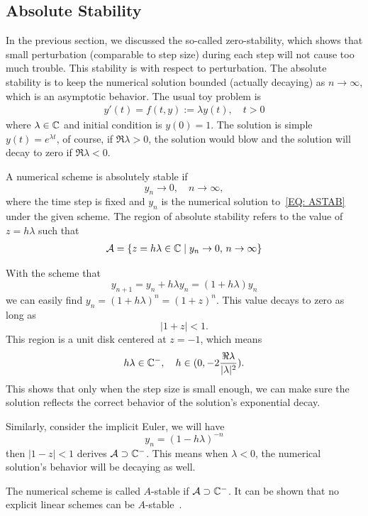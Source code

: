 \subsection{Absolute Stability}
In the previous section, we discussed the so-called zero-stability, which shows that small perturbation (comparable to step size) during each step will not cause too much trouble. This stability is with respect to perturbation. The absolute stability is to keep the numerical solution bounded (actually decaying) as $n\to \infty$, which is an asymptotic behavior. The usual toy problem is 
\begin{eqnarray}\label{EQ: ASTAB}
    y'(t) = f(t, y):= \lambda y(t),\quad t > 0
\end{eqnarray}
where $\lambda \in \mathbb C$ and initial condition is $y(0)= 1$. The solution is simple $y(t) = e^{\lambda t}$, of course, if $\Re \lambda > 0$, the solution would blow and the solution will decay to zero if $\Re \lambda < 0$. 

\begin{definition}
    A numerical scheme is absolutely stable if 
    $$y_n\to 0,\quad n\to \infty,$$
    where the time step is fixed and $y_n$ is the numerical solution to~\eqref{EQ: ASTAB} under the given scheme.  The region of absolute stability refers to the value of $z = h\lambda$ such that 
    \begin{eqnarray}
        \mathcal A = \{ z = h\lambda\in\mathbb C\mid  y_n\to 0,\,n\to \infty\}
    \end{eqnarray}
\end{definition}
\begin{example}
    With the scheme that 
    $$y_{n+1} = y_n + h \lambda y_n = (1 + h\lambda) y_n$$
    we can easily find $y_n = (1 + h\lambda)^n = (1 +z )^n$. This value decays to zero as long as 
    $$|1 + z |< 1.$$
    This region is a unit disk centered at $z= - 1$, which means 
$$h\lambda \in \mathbb C^{-},\quad h\in (0, -2\frac{\Re\lambda}{|\lambda|^2}).$$
This shows that only when the step size is small enough, we can make sure the solution reflects the correct behavior of the solution's exponential decay.
\end{example}
\begin{example}
    Similarly, consider the implicit Euler, we will have 
    $$y_n = (1 - h\lambda)^{-n}$$
    then $|1 - z| < 1$ derives $\mathcal A \supset \mathbb C^{-}$. This means when $\lambda < 0$, the numerical solution's behavior will be decaying as well.
\end{example}
The numerical scheme is called $A$-stable if $\mathcal A\supset\mathbb C^{-}$. It can be shown that no explicit linear schemes can be $A$-stable~\cite{widlund1967note}.







